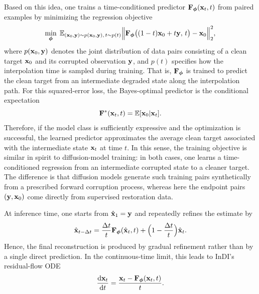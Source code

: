 Based on this idea, one trains a time-conditioned predictor ${\mathbf{F}}_{{\bm{\phi}}}({\mathbf{x}}_t,t)$ from paired examples by minimizing the regression objective
\[
\min_{{\bm{\phi}}}\;
\mathbb E_{({\mathbf{x}}_0,{\mathbf{y}})\sim p({\mathbf{x}}_0,{\mathbf{y}}),\, t\sim p(t)}
\Bigl\|
{\mathbf{F}}_{{\bm{\phi}}}\bigl((1-t){\mathbf{x}}_0+t{\mathbf{y}},\,t\bigr)-{\mathbf{x}}_0
\Bigr\|_2^2,
\]
where $p({\mathbf{x}}_0,{\mathbf{y}})$ denotes the joint distribution of data pairs consisting of a clean target ${\mathbf{x}}_0$ and its corrupted observation ${\mathbf{y}}$, and $p(t)$ specifies how the interpolation time is sampled during training.
That is, ${\mathbf{F}}_{{\bm{\phi}}}$ is trained to predict the clean target from an intermediate degraded state along the interpolation path. For this squared-error loss, the Bayes-optimal predictor is the conditional expectation
\[
{\mathbf{F}}^*({\mathbf{x}}_t,t)=\mathbb E[{\mathbf{x}}_0|{\mathbf{x}}_t].
\]
Therefore, if the model class is sufficiently expressive and the optimization is successful, the learned predictor approximates the average clean target associated with the intermediate state ${\mathbf{x}}_t$ at time $t$. In this sense, the training objective is similar in spirit to diffusion-model training: in both cases, one learns a time-conditioned regression from an intermediate corrupted state to a cleaner target. The difference is that diffusion models generate such training pairs synthetically from a prescribed forward corruption process, whereas here the endpoint pairs $({\mathbf{y}},{\mathbf{x}}_0)$ come directly from supervised restoration data.

At inference time, one starts from $\hat{{\mathbf{x}}}_1={\mathbf{y}}$ and repeatedly refines the estimate by
\[
\hat{{\mathbf{x}}}_{t-\Delta t}
=
\frac{\Delta t}{t}{\mathbf{F}}_{{\bm{\phi}}}(\hat{{\mathbf{x}}}_t,t)
+
\Bigl(1-\frac{\Delta t}{t}\Bigr)\hat{{\mathbf{x}}}_t.
\]
Hence, the final reconstruction is produced by gradual refinement rather than by a single direct prediction. In the continuous-time limit, this leads to InDI's residual-flow ODE
\[
\frac{\mathop{}\!\mathrm{d} {\mathbf{x}}_t}{\mathop{}\!\mathrm{d} t}
=
\frac{{\mathbf{x}}_t-{\mathbf{F}}_{{\bm{\phi}}}({\mathbf{x}}_t,t)}{t}.
\]

